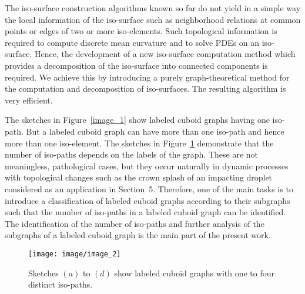 \documentclass[a4paper,11pt]{article}
\begin{document}
The iso-surface construction algorithms known so far do not yield in a simple way the local
information of the iso-surface such as neighborhood relations at common points or
edges of two or more iso-elements. Such topological information is required
to compute discrete mean curvature and to solve PDEs on an iso-surface. Hence, the development of a
new iso-surface computation method which provides a decomposition of the iso-surface into connected
components is required. We achieve this by introducing a purely graph-theoretical method for the
computation and decomposition of iso-surfaces. The resulting algorithm is very efficient.

The sketches in Figure~\ref{image_1} show labeled cuboid graphs having one iso-path.
But a labeled cuboid graph can have more than one iso-path and hence more than
one iso-element. The sketches in Figure~\ref{image_2} demonstrate that the number of
iso-paths depends on the labels of the graph. These are not meaningless, pathological cases, but they
occur naturally in dynamic processes with topological changes such as the crown splash of an impacting
droplet considered as an application in Section~5. Therefore, one of the main tasks is to introduce a
classification of labeled
cuboid graphs according to their subgraphs such that the number of iso-paths in a labeled cuboid graph
can be identified. The identification of the number of iso-paths and further analysis of the subgraphs of
a labeled cuboid graph is the main part of the present work.
\begin{figure}[!ht]
\texttt{[image: image/image\_2]}
\caption{Sketches $(a)$ to $(d)$ show labeled cuboid graphs with one to four distinct iso-paths.}
\label{image_2}
\end{figure}
\end{document}
